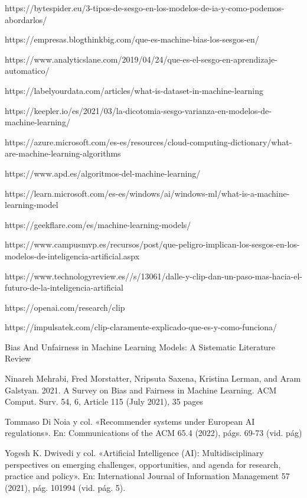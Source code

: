 \documentclass[runningheads,a4paper]{llncs}
\begin{document}
\newpage
\begin{thebibliography}{99}

 https://bytespider.eu/3-tipos-de-sesgo-en-los-modelos-de-ia-y-como-podemos-abordarlos/

 https://empresas.blogthinkbig.com/que-es-machine-bias-los-sesgos-en/

 https://www.analyticslane.com/2019/04/24/que-es-el-sesgo-en-aprendizaje-automatico/

 https://labelyourdata.com/articles/what-is-dataset-in-machine-learning

 https://keepler.io/es/2021/03/la-dicotomia-sesgo-varianza-en-modelos-de-machine-learning/

 https://azure.microsoft.com/es-es/resources/cloud-computing-dictionary/what-are-machine-learning-algorithms

 https://www.apd.es/algoritmos-del-machine-learning/

 https://learn.microsoft.com/es-es/windows/ai/windows-ml/what-is-a-machine-learning-model

 https://geekflare.com/es/machine-learning-models/

 https://www.campusmvp.es/recursos/post/que-peligro-implican-los-sesgos-en-los-modelos-de-inteligencia-artificial.aspx

https://www.technologyreview.es//s/13061/dalle-y-clip-dan-un-paso-mas-hacia-el-futuro-de-la-inteligencia-artificial

https://openai.com/research/clip

 https://impulsatek.com/clip-claramente-explicado-que-es-y-como-funciona/

 Bias And Unfairness in Machine Learning Models: A Sistematic Literature Review

 Ninareh Mehrabi, Fred Morstatter, Nripsuta Saxena, Kristina Lerman, and Aram Galstyan. 2021. A Survey on
Bias and Fairness in Machine Learning. ACM Comput. Surv. 54, 6, Article 115 (July 2021), 35 pages

Tommaso Di Noia y col. «Recommender systems under European AI regulations». En: Communications of the ACM 65.4 (2022), p\'ags. 69-73 (vid. p\'ag)

Yogesh K. Dwivedi y col. «Artificial Intelligence (AI): Multidisciplinary perspectives on emerging challenges, opportunities, and agenda for research, practice and policy». En: International Journal of Information Management 57 (2021),
p\'ag. 101994 (vid. p\'ag. 5).


\end{thebibliography}
\end{document}
